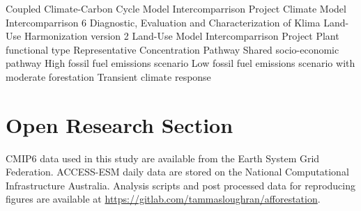 \documentclass[draft]{agujournal2019}
\begin{document}
%


\begin{acronyms}
     Coupled Climate-Carbon Cycle Model Intercomparrison Project
     Climate Model Intercomparrison 6
     Diagnostic, Evaluation and Characterization of Klima
     Land-Use Harmonization version 2
     Land-Use Model Intercomparrison Project
     Plant functional type
     Representative Concentration Pathway
     Shared socio-economic pathway
     High fossil fuel emissions scenario
     Low fossil fuel emissions scenario with moderate forestation
     Transient climate response
\end{acronyms}






%
%

\section*{Open Research Section}
CMIP6 data used in this study are available from the Earth System Grid Federation.
ACCESS-ESM daily data are stored on the National Computational Infrastructure Australia. Analysis scripts and post processed data for reproducing figures are available at \url{https://gitlab.com/tammasloughran/afforestation}.
\end{document}
